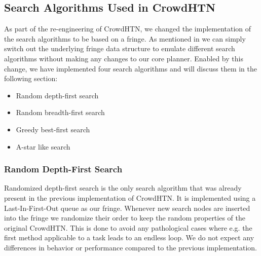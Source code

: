 \subsection{Search Algorithms Used in CrowdHTN}
\label{improv: search algorithms}
As part of the re-engineering of CrowdHTN, we changed the implementation of the search algorithms to be based on a fringe. As mentioned in \cite{holler2020htn} we can simply switch out the underlying fringe data structure to emulate different search algorithms without making any changes to our core planner. Enabled by this change, we have implemented four search algorithms and will discuss them in the following section:
\begin{itemize}
	\item Random depth-first search
	\item Random breadth-first search
	\item Greedy best-first search
	\item A-star like search
\end{itemize}

\subsubsection{Random Depth-First Search}
Randomized depth-first search is the only search algorithm that was already present in the previous implementation of CrowdHTN. It is implemented using a Last-In-First-Out queue as our fringe. Whenever new search nodes are inserted into the fringe we randomize their order to keep the random properties of the original CrowdHTN. This is done to avoid any pathological cases where e.g. the first method applicable to a task leads to an endless loop. We do not expect any differences in behavior or performance compared to the previous implementation.

